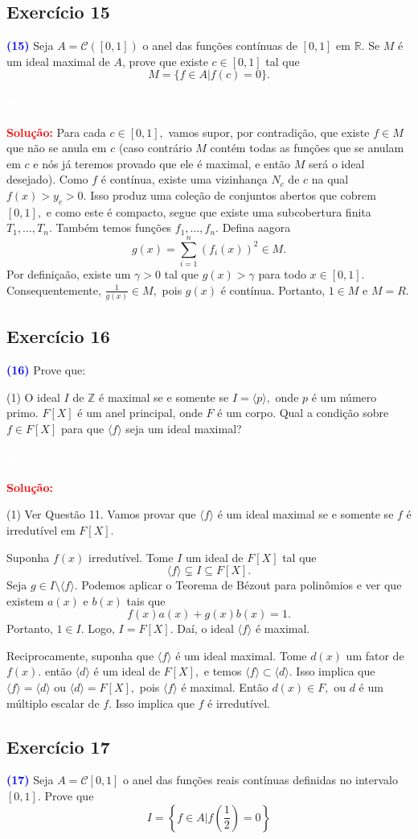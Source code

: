 \documentclass[11pt,a4paper]{article}
\newcommand{\exercicio}[1]{\subsection{Exercício #1} \textcolor{blue}{\bf(#1)}}
\newcommand{\dividiritens}[1]{\begin{tasks}[counter-format={(tsk[a])},label-width=3.6ex, label-format = {\bfseries}, column-sep = {0pt}](1) #1 \end{tasks}}
\newcommand{\pers}[1]{\textcolor{Floresta}{$\negrito{(#1)} $}}
\newcommand{\solucao}[1]{
\textbf{\textcolor{white}{oi}\\ \\ \textcolor{red}{Solução:}} #1}
\begin{document}
\exercicio{15} Seja $A = \mathcal{C}([0, 1])$ o anel das funções contínuas de $[0, 1]$ em $\mathbb{R}.$ Se $M$ é um ideal maximal de $A$, prove que existe $c \in [0, 1]$ tal que \[M = \{f \in A | f(c) = 0\}.\]
\solucao{%
Para cada $c \in [0,1],$ vamos supor, por contradição, que existe $f \in M$ que não se anula em $c$ (caso contrário $M$ contém todas as funções que se anulam em $c$ e nós já teremos provado que ele é maximal, e então $M$ será o ideal desejado). Como $f$ é contínua, existe uma vizinhança $N_c$ de $c$ na qual $f(x) > y_c > 0.$ Isso produz uma coleção de conjuntos abertos que cobrem $[0,1],$ e como este é compacto, segue que existe uma subcobertura finita $T_1, \ldots, T_n.$ Também temos funções $f_1, \ldots, f_n.$ Defina aagora
\[
g(x) = \sum\limits_{i=1}^n (f_i(x))^2 \in M.
\]
Por definiçaão, existe um $\gamma > 0$ tal que $g(x) > \gamma$ para todo $x \in [0,1].$ Consequentemente, $\frac{1}{g(x)} \in M,$ pois $g(x)$ é contínua. Portanto, $1 \in M$ e $M = R.$  
}
\exercicio{16} Prove que: 
\dividiritens{
\task[\pers{a}] O ideal $I$ de $\mathbb{Z}$ é maximal se e somente se $I = \langle p \rangle,$ onde $p$ é um número primo.
\task[\pers{b}] $F[X]$ é um anel principal, onde $F$ é um corpo. Qual a condição sobre $f \in F[X]$ para que $\langle f \rangle$ seja um ideal maximal?
}
\solucao{
\dividiritens{
\task[\pers{a}] Ver Questão 11.
\task[\pers{b}] Vamos provar que $\langle f \rangle$ é um ideal maximal se e somente se $f$ é irredutível em $F[X].$

Suponha $f(x)$ irredutível. Tome $I$ um ideal de $F[X]$ tal que 
\[
\langle f \rangle \subsetneq I \subseteq F[X].
\]
Seja $g \in I \setminus \langle f \rangle.$ Podemos aplicar o Teorema de Bézout para polinômios e ver que existem $a(x)$ e $b(x)$ tais que
\[
f(x)a(x) + g(x)b(x) = 1.
\]
Portanto, $1 \in I.$ Logo, $I = F[X].$ Daí, o ideal $\langle f \rangle$ é maximal.

Reciprocamente, suponha que $\langle f \rangle$ é um ideal maximal. Tome $d(x)$ um fator de $f(x).$ então $\langle d \rangle$ é um ideal de $F[X],$ e temos $\langle f \rangle \subset \langle d \rangle.$ Isso implica que $\langle f \rangle = \langle d \rangle$ ou $\langle d \rangle = F[X],$ pois $\langle f \rangle$ é maximal. Então $d(x) \in F,$ ou $d$ é um múltiplo escalar de $f.$ Isso implica que $f$ é irredutível.
}
}
\exercicio{17} Seja $A = \mathcal{C}[0, 1]$ o anel das funções reais contínuas definidas no intervalo $[0, 1].$ Prove que 
\[I = \left\{f \in A | f \left(\frac{1}{2} \right) = 0 \right\}\]
\end{document}
